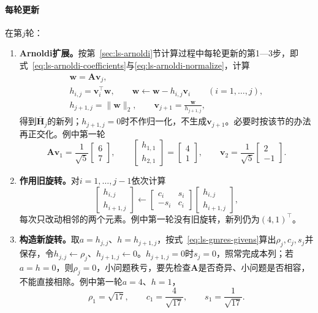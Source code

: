 \paragraph{每轮更新}
在第$j$轮：
\begin{enumerate}
 \item \textbf{Arnoldi扩展。}按第~\ref{sec:ls-arnoldi}节计算过程中每轮更新的第1—3步，即式~\eqref{eq:ls-arnoldi-coefficients}与\eqref{eq:ls-arnoldi-normalize}，计算
 \[
  \begin{gathered}
  \bm w=\bm A\bm v_j ,\\
  h_{i,j}=\bm v_i^\top\bm w,\qquad \bm w\leftarrow\bm w-h_{i,j}\bm v_i\qquad(i=1,\ldots,j),\\
  h_{j+1,j}=\lVert\bm w\rVert_2,\qquad \bm v_{j+1}=\frac{\bm w}{h_{j+1,j}} ,
  \end{gathered}
 \]
 得到$\overline{\bm H}_j$的新列；$h_{j+1,j}=0$时不作归一化，不生成$\bm v_{j+1}$。必要时按该节的办法再正交化。例中第一轮
 \[
  \bm A\bm v_1=\frac1{\sqrt5}\begin{bmatrix}6\\7\end{bmatrix},\qquad
  \begin{bmatrix}h_{1,1}\\h_{2,1}\end{bmatrix}=\begin{bmatrix}4\\1\end{bmatrix},\qquad
  \bm v_2=\frac1{\sqrt5}\begin{bmatrix}2\\-1\end{bmatrix}.
 \]

 \item \textbf{作用旧旋转。}对$i=1,\ldots,j-1$依次计算
 \begin{equation}
  \begin{bmatrix}h_{i,j}\\h_{i+1,j}\end{bmatrix}\leftarrow
  \begin{bmatrix}c_i&s_i\\-s_i&c_i\end{bmatrix}\begin{bmatrix}h_{i,j}\\h_{i+1,j}\end{bmatrix},
  \label{eq:ls-gmres-old-rotations}
 \end{equation}
 每次只改动相邻的两个元素。例中第一轮没有旧旋转，新列仍为$(4,1)^\top$。

 \item \textbf{构造新旋转。}取$a=h_{j,j}$、$h=h_{j+1,j}$，按式~\eqref{eq:ls-gmres-givens}算出$\rho_j,c_j,s_j$并保存，令$h_{j,j}\leftarrow\rho_j$、$h_{j+1,j}\leftarrow0$。$h_{j+1,j}=0$时$s_j=0$，照常完成本列；若$a=h=0$，则$\rho_j=0$，小问题秩亏，要先检查$\bm A$是否奇异、小问题是否相容，不能直接相除。例中第一轮$a=4$、$h=1$，
 \[
  \rho_1=\sqrt{17},\qquad c_1=\frac4{\sqrt{17}},\qquad s_1=\frac1{\sqrt{17}} .
 \]


\end{enumerate}
